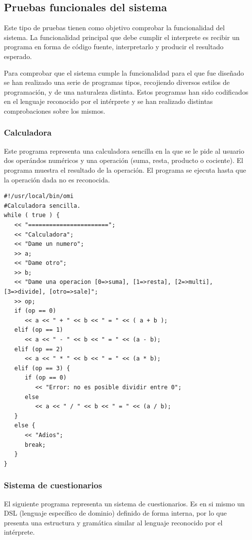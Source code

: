 \subsection{Pruebas funcionales del sistema}
Este tipo de pruebas tienen como objetivo comprobar la funcionalidad del sistema. La funcionalidad principal que debe cumplir el interprete 
es recibir un programa en forma de código fuente, interpretarlo y producir el resultado esperado.

Para comprobar que el sistema cumple la funcionalidad para el que fue diseñado se han realizado una serie de programas tipos, recojiendo diversos estilos de 
programación, y de una naturaleza distinta. Estos programas han sido codificados en el lenguaje reconocido por el intérprete y se han realizado distintas comprobaciones 
sobre los mismos.

\subsubsection{Calculadora}
Este programa representa una calculadora sencilla en la que se le pide al usuario dos operándos numéricos y una operación (suma, resta, producto o cociente). El 
programa muestra el resultado de la operación. El programa se ejecuta hasta que la operación dada no es reconocida. \\

\begin{lstlisting}
#!/usr/local/bin/omi
#Calculadora sencilla.
while ( true ) {
   << "=======================";
   << "Calculadora";
   << "Dame un numero";
   >> a;
   << "Dame otro";
   >> b;
   << "Dame una operacion [0=>suma], [1=>resta], [2=>multi], [3=>divide], [otro=>sale]"; 
   >> op;
   if (op == 0) 
      << a << " + " << b << " = " << ( a + b ); 
   elif (op == 1) 
      << a << " - " << b << " = " << (a - b);
   elif (op == 2) 
      << a << " * " << b << " = " << (a * b);
   elif (op == 3) {
      if (op == 0)
         << "Error: no es posible dividir entre 0";
      else 
         << a << " / " << b << " = " << (a / b);
   }
   else {
      << "Adios";
      break;
   }
}
\end{lstlisting}

\subsubsection{Sistema de cuestionarios}
El siguiente programa representa un sistema de cuestionarios. Es en si mismo un DSL (lenguaje específico de dominio) definido de forma 
interna, por lo que presenta una estructura y gramática similar al lenguaje reconocido por el intérprete. 

